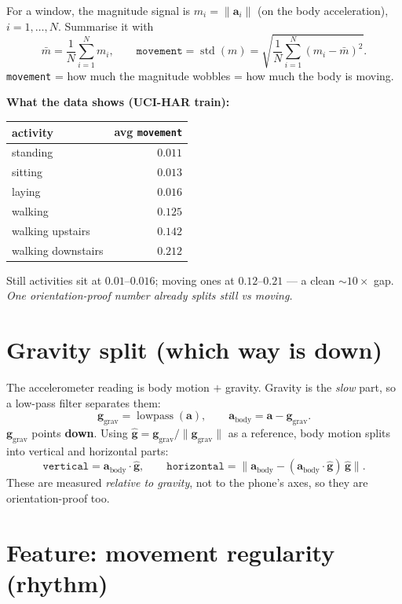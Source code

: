 \documentclass[11pt]{article}
\begin{document}
For a window, the magnitude signal is $m_i=\lVert\mathbf{a}_i\rVert$ (on the body
acceleration), $i=1,\dots,N$.
Summarise it with
\[
  \bar m=\frac1N\sum_{i=1}^{N} m_i,
  \qquad
  \texttt{movement}=\operatorname{std}(m)=\sqrt{\frac1N\sum_{i=1}^{N}(m_i-\bar m)^2}.
\]
\texttt{movement} = how much the magnitude wobbles = how much the body is moving.

\textbf{What the data shows (UCI-HAR train):}
\begin{center}
\begin{tabular}{lr}
activity & avg \texttt{movement}\\ \hline
standing & $0.011$\\
sitting  & $0.013$\\
laying   & $0.016$\\
walking  & $0.125$\\
walking upstairs   & $0.142$\\
walking downstairs & $0.212$\\
\end{tabular}
\end{center}
Still activities sit at $0.01$--$0.016$; moving ones at $0.12$--$0.21$ --- a clean
$\sim\!10\times$ gap. \emph{One orientation-proof number already splits still vs moving.}

\section{Gravity split (which way is down)}

The accelerometer reading is body motion $+$ gravity. Gravity is the \emph{slow}
part, so a low-pass filter separates them:
\[
  \mathbf{g}_{\text{grav}}=\operatorname{lowpass}(\mathbf{a}),
  \qquad
  \mathbf{a}_{\text{body}}=\mathbf{a}-\mathbf{g}_{\text{grav}} .
\]
$\mathbf{g}_{\text{grav}}$ points \textbf{down}. Using $\hat{\mathbf g}=\mathbf{g}_{\text{grav}}/\lVert\mathbf{g}_{\text{grav}}\rVert$
as a reference, body motion splits into vertical and horizontal parts:
\[
  \texttt{vertical}=\mathbf{a}_{\text{body}}\cdot\hat{\mathbf g},
  \qquad
  \texttt{horizontal}=\bigl\lVert \mathbf{a}_{\text{body}}-(\mathbf{a}_{\text{body}}\cdot\hat{\mathbf g})\,\hat{\mathbf g}\bigr\rVert .
\]
These are measured \emph{relative to gravity}, not to the phone's axes, so they are
orientation-proof too.

\section{Feature: movement regularity (rhythm)}
\end{document}

